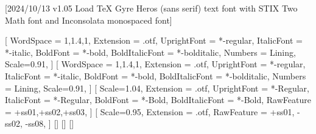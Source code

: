 
[2024/10/13 v1.05 Load TeX Gyre Heros (sans serif) text font with STIX Two Math font and Inconsolata monospaced font]

%
%
\ifpdftex
	\RequirePackage[T1]{fontenc}
	\RequirePackage{bm}
\else
    \RequirePackage[warnings-off={mathtools-colon,mathtools-overbracket}]{unicode-math}

    \setmainfont{texgyreheros}[%
		WordSpace = {1,1.4,1},
		Extension = .otf,
    	UprightFont = *-regular,
    	ItalicFont = *-italic,
    	BoldFont = *-bold,
    	BoldItalicFont = *-bolditalic,
		Numbers = Lining,
    	Scale=0.91,
	]        
    \setsansfont{texgyreheros}[%
		WordSpace = {1,1.4,1},
		Extension = .otf,
    	UprightFont = *-regular,
    	ItalicFont = *-italic,
    	BoldFont = *-bold,
    	BoldItalicFont = *-bolditalic,
		Numbers = Lining,
    	Scale=0.91,
	]        
   \setmonofont{Inconsolatazi4}[%
        Scale=1.04,
        Extension = .otf,
        UprightFont = *-Regular,
        ItalicFont = *-Regular,%
        BoldFont = *-Bold, 
    	BoldItalicFont = *-Bold,%
        RawFeature = {+ss01,+ss02,+ss03},
    ]             
    [%
    	Scale=0.95,%
    	Extension = .otf,
    	RawFeature = {+ss01, -ss02, -ss08},
    ]
    \setmathfontface{}[]%
    \setmathfontface{}[]
    \setmathfontface{}[]%
    \newcommand*{\FRAC}[1]{{\addfontfeature{Fractions=On}#1}}%
\fi
